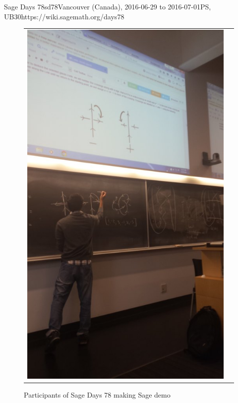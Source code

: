\begin{event}{Sage Days 78}{sd78}{Vancouver (Canada), 2016-06-29 to 2016-07-01}{PS, UB}{30}{https://wiki.sagemath.org/days78}
\begin{figure}[ht]
\caption*{Participants of Sage Days 78 making Sage demo}
\begin{tabular}{cc}
\includegraphics[scale=0.3]{pictures/sd78-1.jpg}
&

\end{tabular}
\end{figure}
\end{event}
